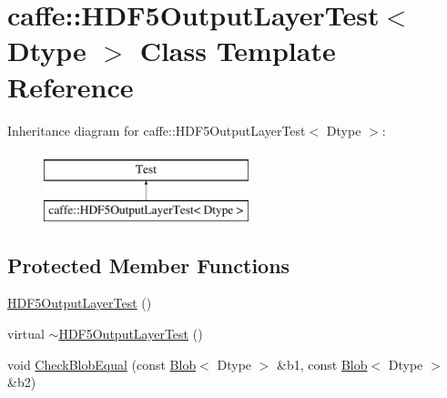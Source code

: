 \hypertarget{classcaffe_1_1_h_d_f5_output_layer_test}{\section{caffe\+:\+:H\+D\+F5\+Output\+Layer\+Test$<$ Dtype $>$ Class Template Reference}
\label{classcaffe_1_1_h_d_f5_output_layer_test}
}
Inheritance diagram for caffe\+:\+:H\+D\+F5\+Output\+Layer\+Test$<$ Dtype $>$\+:\begin{figure}[H]
\begin{center}
\leavevmode
\includegraphics[height=2.000000cm]{classcaffe_1_1_h_d_f5_output_layer_test}
\end{center}
\end{figure}
\subsection*{Protected Member Functions}
\begin{DoxyCompactItemize}
\item 
\hyperlink{classcaffe_1_1_h_d_f5_output_layer_test_acee50633466c0b51ac035ddf36aa0cce}{H\+D\+F5\+Output\+Layer\+Test} ()
\item 
virtual \hyperlink{classcaffe_1_1_h_d_f5_output_layer_test_a371fac84fea6914e6fe5a0706628f700}{$\sim$\+H\+D\+F5\+Output\+Layer\+Test} ()
\item 
void \hyperlink{classcaffe_1_1_h_d_f5_output_layer_test_a8b5a19f721a52d532cc4118b2302e450}{Check\+Blob\+Equal} (const \hyperlink{classcaffe_1_1_blob}{Blob}$<$ Dtype $>$ \&b1, const \hyperlink{classcaffe_1_1_blob}{Blob}$<$ Dtype $>$ \&b2)
\end{DoxyCompactItemize}
